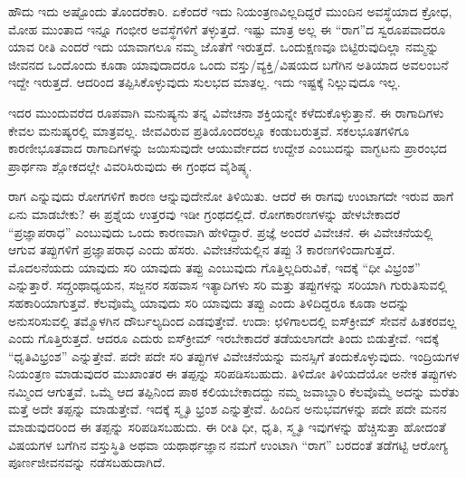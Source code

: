 {ಹೌದು ಇದು ಅಷ್ಟೊಂದು ತೊಂದರೆಕಾರಿ. ಏಕೆಂದರೆ ಇದು ನಿಯಂತ್ರಣವಿಲ್ಲದಿದ್ದರೆ  ಮುಂದಿನ ಅವಸ್ಥೆಯಾದ ಕ್ರೋಧ, ಮೋಹ ಮುಂತಾದ ಇನ್ನೂ ಗಂಭೀರ ಅವಸ್ಥೆಗಳಿಗೆ ತಳ್ಳುತ್ತದೆ. ಇಷ್ಟು ಮಾತ್ರ ಅಲ್ಲ ಈ “ರಾಗ”ದ ಸ್ವರೂಪವಾದರೂ ಯಾವ ರೀತಿ ಎಂದರೆ ಇದು ಯಾವಾಗಲೂ ನಮ್ಮ ಜೊತೆಗೆ ಇರುತ್ತದೆ. ಒಂದುಕ್ಷಣವೂ ಬಿಟ್ಟಿರುವುದಿಲ್ಲಾ \break ನಮ್ಮನ್ನು ಜೀವನದ ಒಂದೊಂದು ಕೂಡಾ ಯಾವುದಾದರೂ ಒಂದು ವಸ್ತು/ವ್ಯಕ್ತಿ/ವಿಷ\-ಯದ ಬಗೆಗಿನ ಅತಿಯಾದ ಅವಲಂಬನೆ ಇದ್ದೇ ಇರುತ್ತದೆ. ಆದರಿಂದ ತಪ್ಪಿಸಿಕೊಳ್ಳುವುದು ಸುಲಭದ ಮಾತಲ್ಲ. ಇದು ಇಷ್ಟಕ್ಕೆ ನಿಲ್ಲುವುದೂ ಇಲ್ಲ.

ಇದರ ಮುಂದುವರೆದ ರೂಪವಾಗಿ ಮನುಷ್ಯನು ತನ್ನ ವಿವೇಚನಾ ಶಕ್ತಿಯನ್ನೇ ಕಳೆದು\-ಕೊಳ್ಳುತ್ತಾನೆ. ಈ ರಾಗಾದಿಗಳು ಕೇವಲ ಮನುಷ್ಯರಲ್ಲಿ ಮಾತ್ರವಲ್ಲ. ಜೀವವಿರುವ ಪ್ರತಿಯೊಂದರಲ್ಲೂ ಕಂಡುಬರುತ್ತವೆ.  ಸಕಲಭೂತಗಳಿಗೂ ಕಾರಣೀಭೂತವಾದ ರಾಗಾದಿಗಳನ್ನು ಜಯಿಸುವುದೇ ಆಯುರ್ವೇದದ ಉದ್ದೇಶ ಎಂಬುದನ್ನು ವಾಗ್ಭಟನು ಪ್ರಾರಂಭದ ಪ್ರಾರ್ಥನಾ ಶ್ಲೋಕದಲ್ಲೇ ವಿವರಿಸಿರುವುದು ಈ ಗ್ರಂಥದ ವೈಶಿಷ್ಠ್ಯ.

ರಾಗ ಎನ್ನುವುದು ರೋಗಗಳಿಗೆ ಕಾರಣ ಆನ್ನುವುದೇನೋ ತಿಳಿಯಿತು. ಆದರೆ ಈ ರಾಗವು ಉಂಟಾಗದೇ ಇರುವ ಹಾಗೆ ಏನು ಮಾಡಬೇಕು? ಈ ಪ್ರಶ್ನೆಯ ಉತ್ತರವು ಇಡೀ ಗ್ರಂಥದಲ್ಲಿದೆ. ರೋಗಕಾರಣಗಳನ್ನು ಹೇಳಬೇಕಾದರೆ “ಪ್ರಜ್ಞಾಪರಾಧ” ಎಂಬುವುದು ಒಂದು ಕಾರಣವಾಗಿ ಹೇಳಿದ್ದಾರೆ. ಪ್ರಜ್ಞೆ ಅಂದರೆ ವಿವೇಚನೆ. ಈ ವಿವೇಚನೆಯಲ್ಲಿ ಆಗುವ ತಪ್ಪುಗಳಿಗೆ ಪ್ರಜ್ಞಾಪರಾಧ ಎಂದು ಹೆಸರು. ವಿವೇಚನೆಯಲ್ಲಿನ ತಪ್ಪು 3 ಕಾರಣಗಳಿಂದಾಗುತ್ತದೆ. ಮೊದಲನೆಯದು ಯಾವುದು ಸರಿ ಯಾವುದು ತಪ್ಪು ಎಂಬುವುದು ಗೊತ್ತಿಲ್ಲದಿರುವಿಕೆ, ಇದಕ್ಕೆ “ಧೀ ವಿಭ್ರಂಶ” ಎನ್ನುತ್ತಾರೆ. ಸದ್ಗ್ರಂಥಾಧ್ಯಯನ, ಸಜ್ಜನರ ಸಹವಾಸ ಇತ್ಯಾದಿಗಳು ಸರಿ ಮತ್ತು ತಪ್ಪುಗಳನ್ನು ಸರಿಯಾಗಿ ಗುರುತಿಸುವಲ್ಲಿ ಸಹಕಾರಿಯಾಗುತ್ತವೆ. ಕೆಲವೊಮ್ಮೆ ಯಾವುದು ಸರಿ ಯಾವುದು ತಪ್ಪು ಎಂದು ತಿಳಿದಿದ್ದರೂ ಕೂಡಾ ಅದನ್ನು ಅನುಸರಿಸುವಲ್ಲಿ ತಮ್ಮೊಳಗಿನ ದೌರ್ಬಲ್ಯದಿಂದ ಎಡವುತ್ತೇವೆ. ಉದಾ: ಛಳಿಗಾಲದಲ್ಲಿ  ಐಸ್‍ಕ್ರೀಮ್ ಸೇವನೆ ಹಿತಕರವಲ್ಲ ಎಂದು ಗೊತ್ತಿರುತ್ತದೆ. ಆದರೂ ಎದುರು ಐಸ್‍ಕ್ರೀಮ್ ಇರಬೇಕಾದರೆ ತಡೆಯಲಾಗದೇ ತಿಂದು ಬಿಡುತ್ತೇವೆ. ಇದಕ್ಕೆ “ಧೃತಿ\-ವಿಭ್ರಂಶ” ಎನ್ನುತ್ತೇವೆ. ಪದೇ ಪದೇ ಸರಿ ತಪ್ಪುಗಳ ವಿವೇಚನೆಯನ್ನು ಮನಸ್ಸಿಗೆ ತಂದುಕೊಳ್ಳುವುದು. ಇಂದ್ರಿಯಗಳ ನಿಯಂತ್ರಣ ಮಾಡುವುದರ ಮುಖಾಂತರ ಈ ತಪ್ಪನ್ನು ಸರಿಪಡಿಸ\-\break ಬಹುದು. ತಿಳಿದೋ ತಿಳಿಯದೆಯೋ ಅನೇಕ ತಪ್ಪುಗಳು ನಮ್ಮಿಂದ ಆಗುತ್ತವೆ. ಒಮ್ಮೆ ಆದ ತಪ್ಪಿನಿಂದ ಪಾಠ ಕಲಿಯಬೇಕಾದದ್ದು ನಮ್ಮ ಜವಾಬ್ದಾರಿ ಕೆಲವೊಮ್ಮೆ ಅದನ್ನು ಮರೆತು ಮತ್ತೆ ಅದೇ ತಪ್ಪನ್ನು ಮಾಡುತ್ತೇವೆ. ಇದಕ್ಕೆ ಸ್ಮೃತಿ ಭ್ರಂಶ ಎನ್ನುತ್ತೇವೆ. ಹಿಂದಿನ ಅನುಭವಗಳನ್ನು ಪದೇ ಪದೇ ಮನನ ಮಾಡುವುದರಿಂದ ಈ ತಪ್ಪನ್ನು ಸರಿಪಡಿಸಬಹುದು. ಈ ರೀತಿ ಧೀ, ಧೃತಿ, ಸ್ಮೃತಿ ಇವುಗಳನ್ನು ಹೆಚ್ಚಿಸುತ್ತಾ ಹೋದಂತೆ ವಿಷಯಗಳ ಬಗೆಗಿನ ವಸ್ತುಸ್ಥಿತಿ ಅಥವಾ ಯಥಾರ್ಥಜ್ಞಾನ ನಮಗೆ ಉಂಟಾಗಿ “ರಾಗ” ಬರದಂತೆ ತಡೆಗಟ್ಟಿ ಆರೋಗ್ಯ ಪೂರ್ಣಜೀವನವನ್ನು ನಡೆಸಬಹುದಾಗಿದೆ.

\articleend
}
